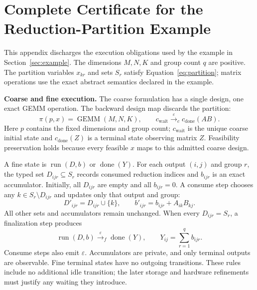 \documentclass[11pt]{article}
\begin{document}
\section{Complete Certificate for the Reduction-Partition Example}\label{app:partition-proof}
This appendix discharges the execution obligations used by the example in Section~\ref{sec:example}. The dimensions $M,N,K$ and group count $q$ are positive. The partition variables $x_{kr}$ and sets $S_r$ satisfy Equation~\ref{eq:partition}; matrix operations use the exact abstract semantics declared in the example.

\textbf{Coarse and fine execution.} The coarse formulation has a single design, one exact GEMM operation. The backward design map discards the partition:
\begin{equation}
 \pi(p,x)=\operatorname{GEMM}(M,N,K),\qquad
 c_{\mathrm{wait}}\xrightarrow{\varepsilon}_c c_{\mathrm{done}}(AB).
 \label{eq:gemm-abstraction}
\end{equation}
Here $p$ contains the fixed dimensions and group count; $c_{\mathrm{wait}}$ is the unique coarse initial state and $c_{\mathrm{done}}(Z)$ is a terminal state observing matrix $Z$. Feasibility preservation holds because every feasible $x$ maps to this admitted coarse design.

A fine state is $\operatorname{run}(D,b)$ or $\operatorname{done}(Y)$. For each output $(i,j)$ and group $r$, the typed set $D_{ijr}\subseteq S_r$ records consumed reduction indices and $b_{ijr}$ is an exact accumulator. Initially, all $D_{ijr}$ are empty and all $b_{ijr}=0$. A consume step chooses any $k\in S_r\setminus D_{ijr}$ and updates only that output and group:
\begin{equation}
 D'_{ijr}=D_{ijr}\cup\{k\},\qquad
 b'_{ijr}=b_{ijr}+A_{ik}B_{kj}.
 \label{eq:consume}
\end{equation}
All other sets and accumulators remain unchanged. When every $D_{ijr}=S_r$, a finalization step produces
\begin{equation}
 \operatorname{run}(D,b)\xrightarrow{\varepsilon}_f\operatorname{done}(Y),
 \qquad Y_{ij}=\sum_{r=1}^{q}b_{ijr}.
 \label{eq:gemm-finalize}
\end{equation}
Consume steps also emit $\varepsilon$. Accumulators are private, and only terminal outputs are observable. Fine terminal states have no outgoing transitions. These rules include no additional idle transition; the later storage and hardware refinements must justify any waiting they introduce.
\end{document}
